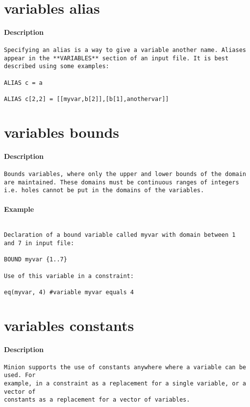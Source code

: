 \section{variables alias}
\paragraph{Description}
{\footnotesize
\begin{verbatim}
Specifying an alias is a way to give a variable another name. Aliases
appear in the **VARIABLES** section of an input file. It is best
described using some examples:

ALIAS c = a

ALIAS c[2,2] = [[myvar,b[2]],[b[1],anothervar]]
\end{verbatim}
}
\section{variables bounds}
\paragraph{Description}
{\footnotesize
\begin{verbatim}
Bounds variables, where only the upper and lower bounds of the domain
are maintained. These domains must be continuous ranges of integers
i.e. holes cannot be put in the domains of the variables.
\end{verbatim}
}
\paragraph{Example}
{\footnotesize
\begin{verbatim}

Declaration of a bound variable called myvar with domain between 1
and 7 in input file:

BOUND myvar {1..7}

Use of this variable in a constraint:

eq(myvar, 4) #variable myvar equals 4
\end{verbatim}
}
\section{variables constants}
\paragraph{Description}
{\footnotesize
\begin{verbatim}
Minion supports the use of constants anywhere where a variable can be used. For
example, in a constraint as a replacement for a single variable, or a vector of
constants as a replacement for a vector of variables.
\end{verbatim}
}
